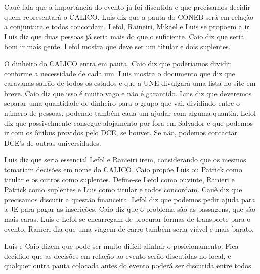 \documentclass{ata-calico}
\begin{document}
\maketitle

Cauê fala que a importância do evento já foi discutida e que precisamos decidir quem representará o CALICO. Luis diz que a pauta do CONEB será em relação a conjuntura e todos concordam. Lefol, Raineiri, Mikael e Luis se propoem a ir. Luis diz que duas pessoas já seria mais do que o suficiente. Caio diz que seria bom ir mais gente. Lefol mostra que deve ser um titular e dois suplentes. 

O dinheiro do CALICO entra em pauta, Caio diz que poderíamos dividir conforme a necessidade de cada um. Luis mostra o documento que diz que caravanas sairão de todos os estados e que a UNE divulgará uma lista no site em breve. Caio diz que isso é muito vago e não é garantido. Luis diz que deveremos separar uma quantidade de dinheiro para o grupo que vai, dividindo entre o número de pessoas, podendo também cada um ajudar com alguma quantia. Lefol diz que possivelmente consegue alojamento por fora em Salvador e que podemos ir com os ônibus providos pelo DCE, se houver. Se não, podemos contactar DCE's de outras universidades.

Luis diz que seria essencial Lefol e Ranieiri irem, considerando que os mesmos tomariam decisões em nome do CALICO.
Caio propõe Luis ou Patrick como titular e os outros como suplentes. Define-se Lefol como ouvinte, Ranieri e Patrick como suplentes e Luis como titular e todos concordam. Cauê diz que precisamos discutir a questão financeira. Lefol diz que podemos pedir ajuda para a JE para pagar as inscrições. Caio diz que o problema são as passagens, que são mais caras. Luis e Lefol se encarregam de procurar formas de transporte para o evento. Ranieri dia que uma viagem de carro também seria viável e mais barato.

Luis e Caio dizem que pode ser muito difícil alinhar o posicionamento. Fica decidido que as decisões em relação ao evento serão discutidas no local, e qualquer outra pauta colocada antes do evento poderá ser discutida entre todos.


\end{document}

